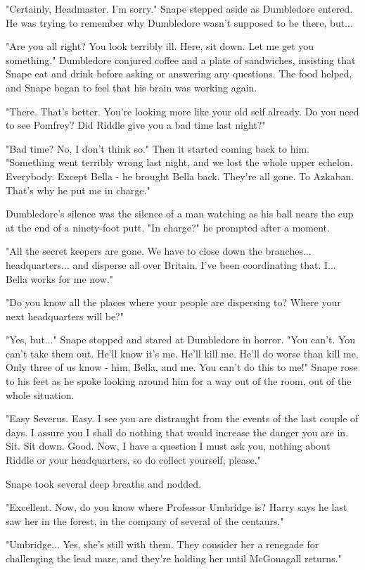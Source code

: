 "Certainly, Headmaster. I'm sorry." Snape stepped aside as Dumbledore entered. He was trying to remember why Dumbledore wasn't supposed to be there, but...

"Are you all right? You look terribly ill. Here, sit down. Let me get you something." Dumbledore conjured coffee and a plate of sandwiches, insisting that Snape eat and drink before asking or answering any questions. The food helped, and Snape began to feel that his brain was working again.

"There. That's better. You're looking more like your old self already. Do you need to see Pomfrey? Did Riddle give you a bad time last night?"

"Bad time? No, I don't think so." Then it started coming back to him. "Something went terribly wrong last night, and we lost the whole upper echelon. Everybody. Except Bella - he brought Bella back. They're all gone. To Azkaban. That's why he put me in charge."

Dumbledore's silence was the silence of a man watching as his ball nears the cup at the end of a ninety-foot putt. "In charge?" he prompted after a moment.

"All the secret keepers are gone. We have to close down the branches... headquarters... and disperse all over Britain. I've been coordinating that. I... Bella works for me now."

"Do you know all the places where your people are dispersing to? Where your next headquarters will be?"

"Yes, but..." Snape stopped and stared at Dumbledore in horror. "You can't. You can't take them out. He'll know it's me. He'll kill me. He'll do worse than kill me. Only three of us know - him, Bella, and me. You can't do this to me!" Snape rose to his feet as he spoke looking around him for a way out of the room, out of the whole situation.

"Easy Severus. Easy. I see you are distraught from the events of the last couple of days. I assure you I shall do nothing that would increase the danger you are in. Sit. Sit down. Good. Now, I have a question I must ask you, nothing about Riddle or your headquarters, so do collect yourself, please."

Snape took several deep breaths and nodded.

"Excellent. Now, do you know where Professor Umbridge is? Harry says he last saw her in the forest, in the company of several of the centaurs."

"Umbridge... Yes, she's still with them. They consider her a renegade for challenging the lead mare, and they're holding her until McGonagall returns."

